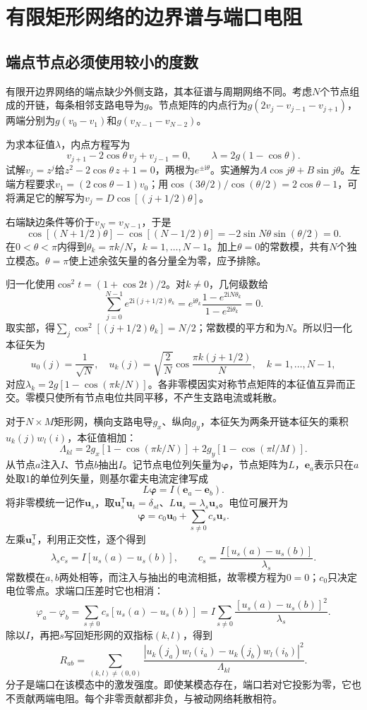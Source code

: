 \section{有限矩形网络的边界谱与端口电阻}
\subsection{端点节点必须使用较小的度数}
有限开边界网络的端点缺少外侧支路，其本征谱与周期网络不同。考虑$N$个节点组成的开链，每条相邻支路电导为$g$。节点矩阵的内点行为$g(2v_j-v_{j-1}-v_{j+1})$，两端分别为$g(v_0-v_1)$和$g(v_{N-1}-v_{N-2})$。

为求本征值$\lambda$，内点方程写为
\[v_{j+1}-2\cos\theta\,v_j+v_{j-1}=0,\qquad
\lambda=2g(1-\cos\theta).\]
试解$v_j=z^j$给$z^2-2\cos\theta\,z+1=0$，两根为$e^{\pm\mathrm i\theta}$。实通解为$A\cos j\theta+B\sin j\theta$。左端方程要求$v_1=(2\cos\theta-1)v_0$；用$\cos(3\theta/2)/\cos(\theta/2)=2\cos\theta-1$，可将满足它的解写为$v_j=D\cos[(j+1/2)\theta]$。

右端缺边条件等价于$v_N=v_{N-1}$，于是
\[\cos[(N+1/2)\theta]-\cos[(N-1/2)\theta]
=-2\sin N\theta\sin(\theta/2)=0.\]
在$0<\theta<\pi$内得到$\theta_k=\pi k/N$，$k=1,\ldots,N-1$。加上$\theta=0$的常数模，共有$N$个独立模态。$\theta=\pi$使上述余弦矢量的各分量全为零，应予排除。

归一化使用$\cos^2t=(1+\cos2t)/2$。对$k\ne0$，几何级数给
\[\sum_{j=0}^{N-1}e^{2\mathrm i(j+1/2)\theta_k}
=e^{\mathrm i\theta_k}\frac{1-e^{2\mathrm iN\theta_k}}{1-e^{2\mathrm i\theta_k}}=0.\]
取实部，得$\sum_j\cos^2[(j+1/2)\theta_k]=N/2$；常数模的平方和为$N$。所以归一化本征矢为
\[
 u_0(j)=\frac1{\sqrt N},\quad
 u_k(j)=\sqrt{\frac2N}\cos\frac{\pi k(j+1/2)}N,
 \quad k=1,\ldots,N-1,
\]
对应$\lambda_k=2g[1-\cos(\pi k/N)]$。各非零模因实对称节点矩阵的本征值互异而正交。零模只使所有节点电位共同平移，不产生支路电流或耗散。

对于$N\times M$矩形网，横向支路电导$g_x$、纵向$g_y$，本征矢为两条开链本征矢的乘积$u_k(j)w_l(i)$，本征值相加：
\[
 \Lambda_{kl}=2g_x[1-\cos(\pi k/N)]
 +2g_y[1-\cos(\pi l/M)].
\]
从节点$a$注入$I$、节点$b$抽出$I$。记节点电位列矢量为$\boldsymbol\varphi$，节点矩阵为$L$，$\boldsymbol e_a$表示只在$a$处取1的单位列矢量，则基尔霍夫电流定律写成
\[
 L\boldsymbol\varphi=I(\boldsymbol e_a-\boldsymbol e_b).
\]
将非零模统一记作$\boldsymbol u_s$，取$\boldsymbol u_s^{\mathsf T}\boldsymbol u_t=\delta_{st}$、$L\boldsymbol u_s=\lambda_s\boldsymbol u_s$。电位可展开为
\[
 \boldsymbol\varphi=c_0\boldsymbol u_0+\sum_{s\ne0}c_s\boldsymbol u_s.
\]
左乘$\boldsymbol u_s^{\mathsf T}$，利用正交性，逐个得到
\[
 \lambda_s c_s=I[u_s(a)-u_s(b)],\qquad
 c_s=\frac{I[u_s(a)-u_s(b)]}{\lambda_s}.
\]
常数模在$a,b$两处相等，而注入与抽出的电流相抵，故零模方程为$0=0$；$c_0$只决定电位零点。求端口压差时它也相消：
\[
 \varphi_a-\varphi_b
 =\sum_{s\ne0}c_s[u_s(a)-u_s(b)]
 =I\sum_{s\ne0}\frac{[u_s(a)-u_s(b)]^2}{\lambda_s}.
\]
除以$I$，再把$s$写回矩形网的双指标$(k,l)$，得到
\[
 R_{ab}=\sum_{(k,l)\ne(0,0)}
 \frac{|u_k(j_a)w_l(i_a)-u_k(j_b)w_l(i_b)|^2}{\Lambda_{kl}}.
\]
分子是端口在该模态中的激发强度。即使某模态存在，端口若对它投影为零，它也不贡献两端电阻。每个非零贡献都非负，与被动网络耗散相符。


